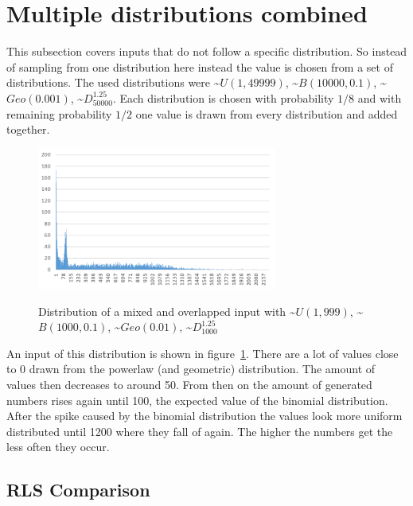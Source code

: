 \section{Multiple distributions combined}
This subsection covers inputs that do not follow a specific distribution.
So instead of sampling from one distribution here instead the value is chosen from a set of distributions.
The used distributions were \textasciitilde$U(1,49999)$, \textasciitilde$B(10000,0.1)$, \textasciitilde$Geo(0.001)$, \textasciitilde$D^{1.25}_{50000}$.
Each distribution is chosen with probability $1/8$ and with remaining probability $1/2$ one value is drawn from every distribution and added together.

\begin{figure}[h]
      \caption{Distribution of a mixed and overlapped input with \textasciitilde$U(1,999)$, \textasciitilde$B(1000,0.1)$, \textasciitilde$Geo(0.01)$, \textasciitilde$D^{1.25}_{1000}$}
      \centering
      \includegraphics[width=0.7\textwidth]{figures/images/numberGenerator/mixedAndOverlapped.png}\label{fig:mixAndOverlDistExample}
\end{figure}


An input of this distribution is shown in figure~\ref{fig:mixAndOverlDistExample}.
There are a lot of values close to 0 drawn from the powerlaw (and geometric) distribution.
The amount of values then decreases to around 50.
From then on the amount of generated numbers rises again until 100, the expected value of the binomial distribution.
After the spike caused by the binomial distribution the values look more uniform distributed until 1200 where they fall of again.
The higher the numbers get the less often they occur.

\subsection{RLS Comparison}



